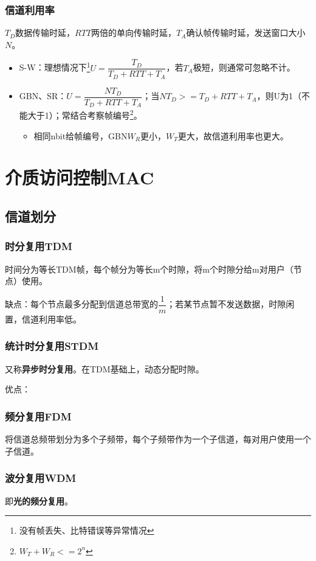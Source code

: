 \subsubsection{信道利用率}
\(T_D\)数据传输时延，\(RTT\)两倍的单向传输时延，\(T_A\)确认帧传输时延，发送窗口大小\(N\)。
\begin{itemize}
    \item S-W：理想情况下\footnote{没有帧丢失、比特错误等异常情况}\(U = \dfrac{T_D}{T_D + RTT + T_A}\)，若\(T_A\)极短，则通常可忽略不计。
    \item GBN、SR：\(U = \dfrac{NT_D}{T_D + RTT + T_A}\)；当\(NT_D >= T_D + RTT + T_A\)，则U为1（不能大于1）；常结合考察帧编号\footnote{\(W_T + W_R <= 2^n\)}。
    \begin{itemize}
        \item 相同nbit给帧编号，GBN\(W_R\)更小，\(W_T\)更大，故信道利用率也更大。
    \end{itemize}
\end{itemize}


\section{介质访问控制MAC}

\subsection{信道划分}

\subsubsection{时分复用TDM}
时间分为等长TDM帧，每个帧分为等长m个时隙，将m个时隙分给m对用户（节点）使用。

缺点：每个节点最多分配到信道总带宽的\(\dfrac{1}{m}\)；若某节点暂不发送数据，时隙闲置，信道利用率低。


\subsubsection{统计时分复用STDM}
又称\textbf{异步时分复用}。在TDM基础上，动态分配时隙。

优点：


\subsubsection{频分复用FDM}
将信道总频带划分为多个子频带，每个子频带作为一个子信道，每对用户使用一个子信道。


\subsubsection{波分复用WDM}
即\textbf{光的频分复用}。


